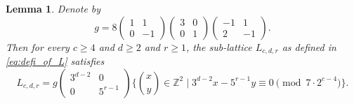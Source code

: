 \documentclass[11pt,letterpaper]{amsart}
\newtheorem{lem}[theorem]{Lemma}
\theoremstyle{definition}
\theoremstyle{remark}
\newcommand{\bb}[1]{\mathbb{#1}}
\newcommand{\Z}{\bb Z}
\begin{document}
	
	\begin{lem}\label{defin-Lcde}
		Denote by 
		$$g = 8 
		\left( 
		\begin{array}{rr}
			1 & 1\\
			0 & -1  
		\end{array}\right)
		\begin{pmatrix}
			3 & 0 \\
			0 & 1
		\end{pmatrix}
		\left( \begin{array}{rr}
			-1 & 1 \\
			2 & -1
		\end{array}\right).$$
		Then for every $c\geq 4$ and $d\geq 2$ and $r\geq 1$, the sub-lattice $L_{c,d,r}$ as defined in \cref{eq:defi_of_L} satisfies 
		$$L_{c,d,r} = g
		\begin{pmatrix}
			3^{d-2} & 0 \\
			0 & 5^{r-1}
		\end{pmatrix} 
		\bigg\lbrace 
		\binom{x}{y} \in \Z^2
		\; \bigg\vert \;
		3^{d-2} x - 5^{r-1} y \equiv 0 \pmod{ 7 \cdot 2^{c-4}}
		\bigg\rbrace.$$
	\end{lem}
\end{document}
